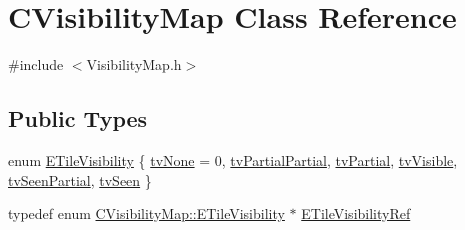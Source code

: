 \hypertarget{classCVisibilityMap}{}\section{C\+Visibility\+Map Class Reference}
\label{classCVisibilityMap}


{\ttfamily \#include $<$Visibility\+Map.\+h$>$}

\subsection*{Public Types}
\begin{DoxyCompactItemize}
\item 
enum \hyperlink{classCVisibilityMap_a6665f905da08825adbb0eee7bd1f2f30}{E\+Tile\+Visibility} \{ \newline
\hyperlink{classCVisibilityMap_a6665f905da08825adbb0eee7bd1f2f30aec106086bdc6328c8c6c02ee1bf32d2c}{tv\+None} = 0, 
\hyperlink{classCVisibilityMap_a6665f905da08825adbb0eee7bd1f2f30a75af969b6d667b802b64bacd8bca7b63}{tv\+Partial\+Partial}, 
\hyperlink{classCVisibilityMap_a6665f905da08825adbb0eee7bd1f2f30a0037f47075e3bde5e8e32dbd55754976}{tv\+Partial}, 
\hyperlink{classCVisibilityMap_a6665f905da08825adbb0eee7bd1f2f30a3c881652ef7164aa086e595eef0ff5d6}{tv\+Visible}, 
\newline
\hyperlink{classCVisibilityMap_a6665f905da08825adbb0eee7bd1f2f30a7f9292f5d7ed9e9497f8ef342c890466}{tv\+Seen\+Partial}, 
\hyperlink{classCVisibilityMap_a6665f905da08825adbb0eee7bd1f2f30ab7c30a117286ac3a8891862f6c1bb5c6}{tv\+Seen}
 \}
\item 
typedef enum \hyperlink{classCVisibilityMap_a6665f905da08825adbb0eee7bd1f2f30}{C\+Visibility\+Map\+::\+E\+Tile\+Visibility} $\ast$ \hyperlink{classCVisibilityMap_a6cf5b0323092b90b86a6d3d8778b4fb1}{E\+Tile\+Visibility\+Ref}
\end{DoxyCompactItemize}
